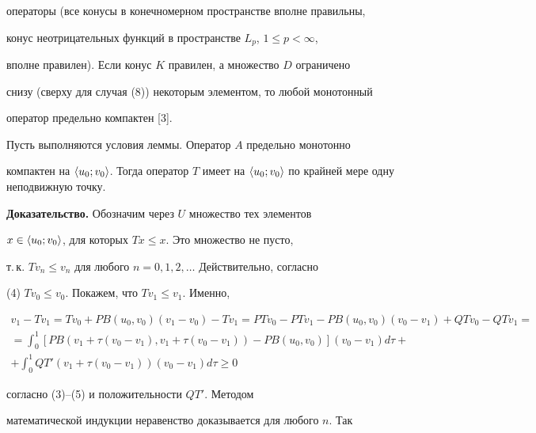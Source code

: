 операторы (все конусы в конечномерном пространстве вполне правильны, 


конус неотрицательных функций в пространстве $L_p$, $1\le p<\infty$, 


вполне правилен). Если конус $K$ правилен, а множество $D$ ограничено 


снизу (сверху для случая (8)) некоторым элементом, то любой монотонный 


оператор предельно компактен [3]. 


 


\begin{thm} 


Пусть выполняются условия леммы. Оператор $A$ предельно монотонно 


компактен на $\la u_0;v_0\ra$. Тогда оператор $T$ имеет на $\la 


u_0;v_0\ra$ по крайней мере одну неподвижную точку. 


\end{thm} 


 


{\bf Доказательство.} Обозначим через $U$ множество тех элементов 


$x\in\langle u_0;v_0\rangle$, для которых $T x\le x$. Это множество не пусто, 


т.\,к. $T v_n\le v_n$ для любого $n=0,1,2,\dotsc$ Действительно, согласно 


(4)\; $T v_0\le v_0$. Покажем, что $T v_1\le v_1$. Именно,


\begin{multline*} 


v_1-T v_1=T v_0+P B(u_0,v_0)(v_1-v_0)-T v_1= 


P T v_0-P T v_1-P B(u_0,v_0)(v_0-v_1)+Q T v_0-Q T v_1= \\ 


% 


=\int^1_0[P B(v_1+\tau(v_0-v_1),v_1+\tau(v_0-v_1))- 


P B(u_0,v_0)](v_0-v_1)d\tau+ \\ 


% 


+\int^1_0 Q T'(v_1+\tau(v_0-v_1))(v_0-v_1)d\tau\ge0 


\end{multline*} 


согласно (3)--(5) и положительности $Q T'$. Методом 


математической индукции неравенство доказывается для любого $n$. Так 


